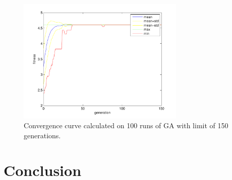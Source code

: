 \documentclass[a4paper]{IEEEtran}
\begin{document}
\begin{figure}[h]
	\centering
	\includegraphics[width=80mm]{conv_curve}
	\caption{Convergence curve calculated on 100 runs of GA with limit of 150 generations.}
	\label{conv_curve}
\end{figure}


\section{Conclusion}


%


\appendices
\end{document}
